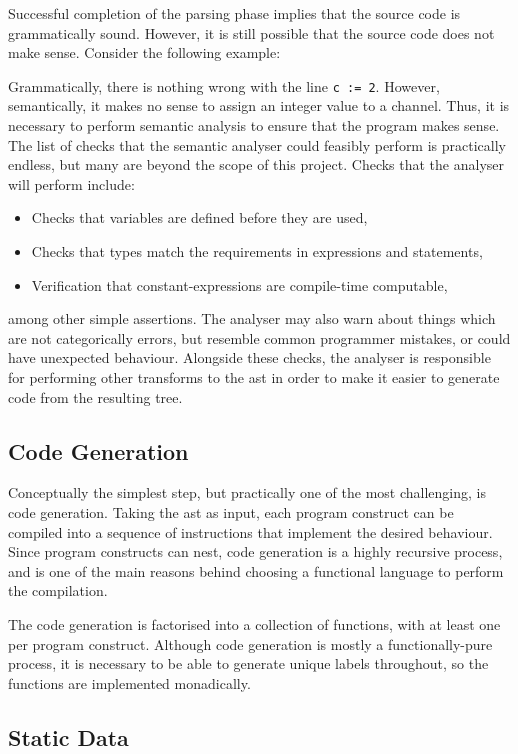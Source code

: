 Successful completion of the parsing phase implies that the source code is
grammatically sound. However, it is still possible that the source code does not
make sense. Consider the following example:

Grammatically, there is nothing wrong with the line \texttt{c := 2}. However,
semantically, it makes no sense to assign an integer value to a channel. Thus,
it is necessary to perform semantic analysis to ensure that the program makes
sense. The list of checks that the semantic analyser could feasibly perform is
practically endless, but many are beyond the scope of this project. Checks that
the analyser will perform include:
\begin{itemize}
  \item Checks that variables are defined before they are used,
  \item Checks that types match the requirements in expressions and statements,
  \item Verification that constant-expressions are compile-time computable,
\end{itemize}
among other simple assertions. The analyser may also warn about things which are
not categorically errors, but resemble common programmer mistakes, or could have
unexpected behaviour. Alongside these checks, the analyser is responsible for
performing other transforms to the \gls{ast} in order to make it easier to
generate code from the resulting tree.

\subsection{Code Generation} \label{code-gen}

Conceptually the simplest step, but practically one of the most challenging,
is code generation. Taking the \gls{ast} as input, each program construct can be
compiled into a sequence of instructions that implement the desired behaviour.
Since program constructs can nest, code generation is a highly recursive
process, and is one of the main reasons behind choosing a functional language to
perform the compilation.

The code generation is factorised into a collection of functions, with at least
one per program construct. Although code generation is mostly a
functionally-pure process, it is necessary to be able to generate unique labels
throughout, so the functions are implemented monadically.

\subsection{Static Data} \label{static-blob}

